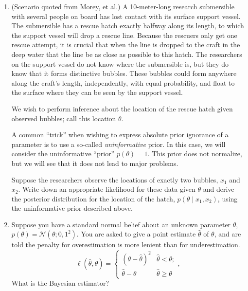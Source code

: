 \documentclass{article}
\newcommand{\given}{\mid}
\newcommand{\mc}[1]{\mathcal{#1}}
\begin{document}
\begin{enumerate}
\item
  (Scenario quoted from Morey, et al.)  A 10-meter-long research
  submersible with several people on board has lost contact with its
  surface support vessel. The submersible has a rescue hatch exactly
  halfway along its length, to which the support vessel will drop a
  rescue line. Because the rescuers only get one rescue attempt, it is
  crucial that when the line is dropped to the craft in the deep water
  that the line be as close as possible to this hatch. The researchers
  on the support vessel do not know where the submersible is, but they
  do know that it forms distinctive bubbles. These bubbles could form
  anywhere along the craft's length, independently, with equal
  probability, and float to the surface where they can be seen by the
  support vessel.

  We wish to perform inference about the location of the rescue
  hatch given observed bubbles; call this location $\theta$.

  A common ``trick'' when wishing to express absolute prior ignorance
  of a parameter is to use a so-called \emph{uninformative} prior. In
  this case, we will consider the uninformative ``prior'' $p(\theta) =
  1$. This prior does not normalize, but we will see that it does not
  lead to major problems.

  Suppose the researchers observe the locations of exactly two
  bubbles, $x_1$ and $x_2$. Write down an appropriate likelihood for
  these data given $\theta$ and derive the posterior distribution for
  the location of the hatch, $p(\theta \given x_1, x_2)$, using the
  uninformative prior described above.

\item

  Suppose you have a standard normal belief about an unknown parameter
  $\theta$, $p(\theta) = \mc{N}(\theta; 0, 1^2)$.  You are asked to
  give a point estimate $\hat{\theta}$ of $\theta$, and are told the
  penalty for overestimation is more lenient than for
  underestimation.
  \begin{equation*}
    \ell(\hat{\theta}, \theta)
    =
    \begin{cases}
      (\theta - \hat{\theta})^2 & \hat{\theta}  <   \theta; \\
      \hat{\theta} - \theta     & \hat{\theta} \geq \theta
    \end{cases},
  \end{equation*}
  What is the Bayesian estimator?


\end{enumerate}
\end{document}
